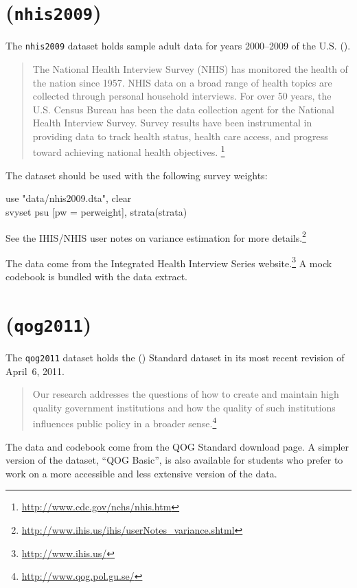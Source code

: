 \section*{\nhis (\texttt{nhis2009})}

The \texttt{nhis2009} dataset holds sample adult data for years 2000--2009 of the U.S. \nhis (\NHIS).

\begin{quote}
	The National Health Interview Survey (NHIS) has monitored the health of the nation since 1957. NHIS data on a broad range of health topics are collected through personal household interviews. For over 50 years, the U.S. Census Bureau has been the data collection agent for the National Health Interview Survey. Survey results have been instrumental in providing data to track health status, health care access, and progress toward achieving national health objectives.%
	\footnote{\url{http://www.cdc.gov/nchs/nhis.htm}} 
\end{quote}

The \NHIS dataset should be used with the following survey weights:

\begin{docspec}
    use "data/nhis2009.dta", clear\\
    svyset psu [pw = perweight], strata(strata)
\end{docspec}

See the IHIS/NHIS user notes on variance estimation for more details.\footnote{\url{http://www.ihis.us/ihis/userNotes_variance.shtml}}

The data come from the Integrated Health Interview Series website.\footnote{\url{http://www.ihis.us/}} A mock codebook is bundled with the data extract.

\section*{\qog (\texttt{qog2011})}

The \texttt{qog2011} dataset holds the \qog (\QOG) Standard dataset in its most recent revision of April~6, 2011.

\begin{quote}
	Our research addresses the questions of how to create and maintain high quality government institutions and how the quality of such institutions influences public policy in a broader sense.\footnote{\url{http://www.qog.pol.gu.se/}}
\end{quote}

The data and codebook come from the QOG Standard download page. A simpler version of the dataset, ``QOG Basic'', is also available for students who prefer to work on a more accessible and less extensive version of the data.

